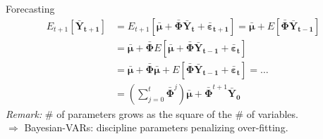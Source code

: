 \documentclass{beamer}
\begin{document}

		
	\begin{frame}{Forecasting}
		\begin{align*}
		E_{t+1}[\bm{\bar{Y}_{t+1}}]&=E_{t+1}[\bm{\bar{\mu}} + \bm{\bar{\Phi}}\bm{\bar{Y}_{t}} + \bm{\bar{\varepsilon}_{t+1}}] =  \bm{\bar{\mu}} + E[\bm{\bar{\Phi}}\bm{\bar{Y}_{t-1}}]\\
		&=\bm{\bar{\mu}} + \bm{\bar{\Phi}}E[\bm{\bar{\mu}} + \bm{\bar{\Phi}}\bm{\bar{Y}_{t-1}} + \bm{\bar{\varepsilon}_{t}}]\\& = \bm{\bar{\mu}} + \bm{\bar{\Phi}} \bm{\bar{\mu}} + E[\bm{\bar{\Phi}}\bm{\bar{Y}_{t-1}} + \bm{\bar{\varepsilon}_{t}}] = \dots \\
		&= \left(\sum_{j=0}^{t}\bm{\bar{\Phi}}^{j}\right) \bm{\bar{\mu}} + \bm{\bar{\Phi}}^{t+1}\bm{\bar{Y}_{0}}
		\end{align*}	
		\pause
		\textit{Remark:} \# of parameters grows as the square of the \# of variables.\\
		\vspace*{1em}
		$\Rightarrow$ Bayesian-VARs: discipline parameters penalizing over-fitting.		
	\end{frame}
	
\end{document}
